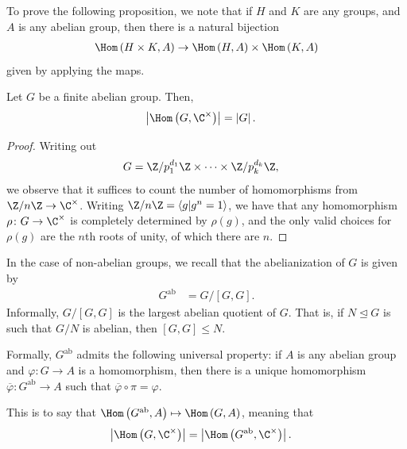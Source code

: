 \documentclass[10pt]{mypackage}
\begin{document}
To prove the following proposition, we note that if $H$ and $K$ are any groups, and $A$ is any abelian group, then there is a natural bijection
\begin{align*}
  \Hom\left( H\times K,A \right)\rightarrow \Hom\left( H,A \right)\times \Hom\left( K,A \right)
\end{align*}
given by applying the maps.
\begin{proposition}
  Let $G$ be a finite abelian group. Then,
  \begin{align*}
    \left\vert \Hom\left( G,\C^{\times} \right) \right\vert &= \left\vert G \right\vert.
  \end{align*}
\end{proposition}
\begin{proof}
  Writing out
  \begin{align*}
    G &= \Z/p_1^{d_1}\Z\times\cdots\times \Z/p_k^{d_k}\Z,
  \end{align*}
  we observe that it suffices to count the number of homomorphisms from $\Z/n\Z\rightarrow \C^{\times}$. Writing $\Z/n\Z = \left\langle g|g^n=1 \right\rangle$, we have that any homomorphism $\rho\colon G\rightarrow \C^{\times}$ is completely determined by $\rho(g)$, and the only valid choices for $\rho(g)$ are the $n$th roots of unity, of which there are $n$.
\end{proof}
In the case of non-abelian groups, we recall that the abelianization of $G$ is given by
\begin{align*}
  G^{\operatorname{ab}} &= G/\left[ G,G \right].
\end{align*}
Informally, $G/\left[ G,G \right]$ is the largest abelian quotient of $G$. That is, if $N\trianglelefteq G$ is such that $G/N$ is abelian, then $\left[ G,G \right]\leq N$.

Formally, $G^{\operatorname{ab}}$ admits the following universal property: if $A$ is any abelian group and $\varphi\colon G\rightarrow A$ is a homomorphism, then there is a unique homomorphism $ \overline{\varphi}\colon G^{\operatorname{ab}}\rightarrow A $ such that $ \overline{\varphi} \circ \pi = \varphi $.

This is to say that $\Hom\left( G^{\operatorname{ab}},A \right) \mapsto \Hom\left( G,A \right)$, meaning that
\begin{align*}
  \left\vert \Hom\left( G,\C^{\times} \right) \right\vert &= \left\vert \Hom\left( G^{\operatorname{ab}},\C^{\times} \right) \right\vert.
\end{align*}
\end{document}
